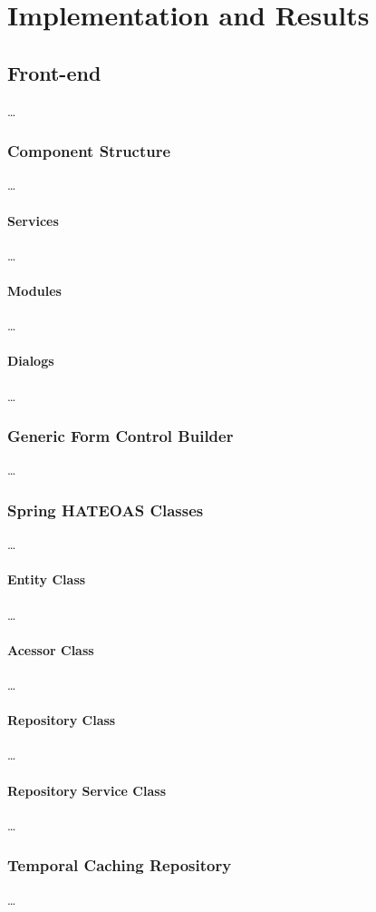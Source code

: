 \chapter{Implementation and Results}\label{cha:implementation}

\section{Front-end}\label{cha:implementation:sec:front-end}
\dots

\subsection{Component Structure}
\dots

\subsubsection{Services}
\dots
\subsubsection{Modules}
\dots
\subsubsection{Dialogs}
\dots
\subsection{Generic Form Control Builder}
\dots
\subsection{Spring HATEOAS Classes}
\dots
\subsubsection{Entity Class}
\dots
\subsubsection{Acessor Class}
\dots
\subsubsection{Repository Class}
\dots
\subsubsection{Repository Service Class}
\dots
\subsection{Temporal Caching Repository}
\dots
